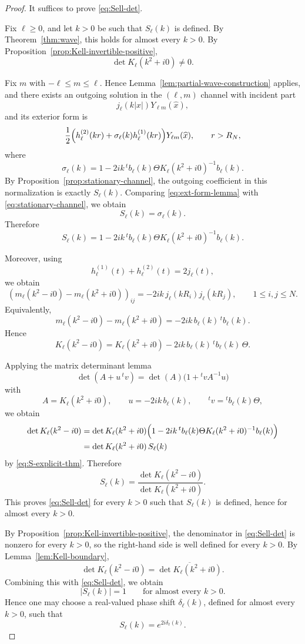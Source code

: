 \documentclass[a4paper,11pt]{article}
\numberwithin{equation}{section}
\newcommand{\jj}[1]{j_{#1}}
\newcommand{\hj}[1]{h^{(1)}_{#1}}
\theoremstyle{definition}
\theoremstyle{remark}
\begin{document}
\begin{proof}
It suffices to prove \eqref{eq:Sell-det}.

Fix $\ell\ge0$, and let $k>0$ be such that $S_\ell(k)$ is defined.
By Theorem~\ref{thm:wave}, this holds for almost every $k>0$.
By Proposition~\ref{prop:Kell-invertible-positive},
\[
\det K_\ell(k^2+i0)\neq0.
\]

Fix $m$ with $-\ell\le m\le\ell$.
Hence Lemma~\ref{lem:partial-wave-construction} applies, and there exists
an outgoing solution in the $(\ell,m)$ channel with incident part
\[
\jj{\ell}(k|x|)Y_{\ell m}(\widehat x),
\]
and its exterior form is
\[
\frac12
\Bigl(
h_\ell^{(2)}(kr)+\sigma_\ell(k)\hj{\ell}(kr)
\Bigr)
Y_{\ell m}(\widehat x),
\qquad r>R_N,
\]
where
\[
\sigma_\ell(k)
=
1-2ik\,{}^t b_\ell(k)\Theta K_\ell(k^2+i0)^{-1}b_\ell(k).
\]
By Proposition~\ref{prop:stationary-channel}, the outgoing coefficient in
this normalization is exactly $S_\ell(k)$. Comparing
\eqref{eq:ext-form-lemma} with \eqref{eq:stationary-channel}, we obtain
\[
S_\ell(k)=\sigma_\ell(k).
\]
Therefore
\begin{equation}\label{eq:S-explicit-thm}
S_\ell(k)
=
1-2ik\,{}^t b_\ell(k)\Theta K_\ell(k^2+i0)^{-1}b_\ell(k).
\end{equation}

Moreover, using
\[
\hj{\ell}(t)+h_\ell^{(2)}(t)=2\jj{\ell}(t),
\]
we obtain
\[
(m_\ell(k^2-i0)-m_\ell(k^2+i0))_{ij}
=
-2ik\,\jj{\ell}(kR_i)\jj{\ell}(kR_j),
\qquad 1\le i,j\le N.
\]
Equivalently,
\[
m_\ell(k^2-i0)-m_\ell(k^2+i0)
=
-2ik\,b_\ell(k)\,{}^t b_\ell(k).
\]
Hence
\[
K_\ell(k^2-i0)
=
K_\ell(k^2+i0)-2ik\,b_\ell(k)\,{}^t b_\ell(k)\,\Theta.
\]

Applying the matrix determinant lemma
\[
\det(A+u\,{}^t v)=\det(A)\bigl(1+{}^t v A^{-1}u\bigr)
\]
with
\[
A=K_\ell(k^2+i0),
\qquad
u=-2ik\,b_\ell(k),
\qquad
{}^t v={}^t b_\ell(k)\Theta,
\]
we obtain
\begin{align*}
\det K_\ell(k^2-i0)
&=
\det K_\ell(k^2+i0)
\Bigl(
1-2ik\,{}^t b_\ell(k)\Theta K_\ell(k^2+i0)^{-1}b_\ell(k)
\Bigr)
\\
&=
\det K_\ell(k^2+i0)\,S_\ell(k)
\end{align*}
by \eqref{eq:S-explicit-thm}. Therefore
\[
S_\ell(k)
=
\frac{\det K_\ell(k^2-i0)}{\det K_\ell(k^2+i0)}.
\]
This proves \eqref{eq:Sell-det} for every $k>0$ such that $S_\ell(k)$ is
defined, hence for almost every $k>0$.

By Proposition~\ref{prop:Kell-invertible-positive}, the denominator in
\eqref{eq:Sell-det} is nonzero for every $k>0$, so the right-hand side is
well defined for every $k>0$.
By Lemma~\ref{lem:Kell-boundary},
\[
\det K_\ell(k^2-i0)
=
\overline{\det K_\ell(k^2+i0)}.
\]
Combining this with \eqref{eq:Sell-det}, we obtain
\[
|S_\ell(k)|=1
\qquad \text{for almost every }k>0.
\]
Hence one may choose a real-valued phase shift $\delta_\ell(k)$, defined for
almost every $k>0$, such that
\[
S_\ell(k)=e^{2i\delta_\ell(k)}.
\]


\end{proof}
\end{document}
